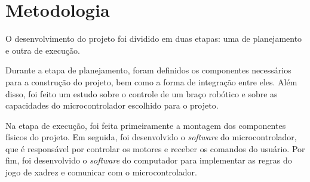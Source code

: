 \chapter[Metodologia]{Metodologia}
\label{cap:metodologia}

O desenvolvimento do projeto foi dividido em duas etapas: uma de planejamento e outra de execução.

Durante a etapa de planejamento, foram definidos os componentes necessários para a construção do projeto, bem como a forma de integração entre eles.
Além disso, foi feito um estudo sobre o controle de um braço robótico e sobre as capacidades do microcontrolador escolhido para o projeto.

Na etapa de execução, foi feita primeiramente a montagem dos componentes físicos do projeto.
Em seguida, foi desenvolvido o \textit{software} do microcontrolador, que é responsável por controlar os motores e receber os comandos do usuário.
Por fim, foi desenvolvido o \textit{software} do computador para implementar as regras do jogo de xadrez e comunicar com o microcontrolador.